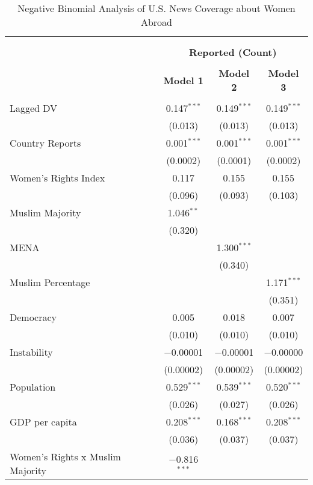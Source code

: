 
\begin{table}[!htbp] \centering 
  \caption{Negative Binomial Analysis of U.S. News Coverage about Women Abroad} 
  \label{table:negbin} 
\begin{tabular}{@{\extracolsep{5pt}}lccc} 
\\[-1.8ex]\hline \\[-1.8ex] 
\\[-1.8ex] & \multicolumn{3}{c}{\textbf{Reported (Count)}} \\ 
\\[-1.8ex] & \textbf{Model 1} & \textbf{Model 2} & \textbf{Model 3}\\ 
\hline \\[-1.8ex] 
 Lagged DV & 0.147$^{***}$ & 0.149$^{***}$ & 0.149$^{***}$ \\ 
  & (0.013) & (0.013) & (0.013) \\ 
  Country Reports & 0.001$^{***}$ & 0.001$^{***}$ & 0.001$^{***}$ \\ 
  & (0.0002) & (0.0001) & (0.0002) \\ 
  Women's Rights Index & 0.117 & 0.155 & 0.155 \\ 
  & (0.096) & (0.093) & (0.103) \\ 
  Muslim Majority & 1.046$^{**}$ &  &  \\ 
  & (0.320) &  &  \\ 
  MENA &  & 1.300$^{***}$ &  \\ 
  &  & (0.340) &  \\ 
  Muslim Percentage &  &  & 1.171$^{***}$ \\ 
  &  &  & (0.351) \\ 
  Democracy & 0.005 & 0.018 & 0.007 \\ 
  & (0.010) & (0.010) & (0.010) \\ 
  Instability & $-$0.00001 & $-$0.00001 & $-$0.00000 \\ 
  & (0.00002) & (0.00002) & (0.00002) \\ 
  Population & 0.529$^{***}$ & 0.539$^{***}$ & 0.520$^{***}$ \\ 
  & (0.026) & (0.027) & (0.026) \\ 
  GDP per capita & 0.208$^{***}$ & 0.168$^{***}$ & 0.208$^{***}$ \\ 
  & (0.036) & (0.037) & (0.037) \\ 
  Women's Rights x Muslim Majority & $-$0.816$^{***}$ &  &  \\ 

\end{tabular}
\end{table}
